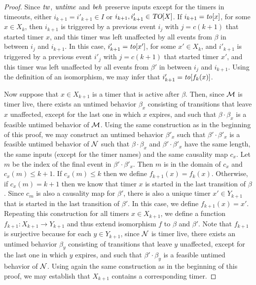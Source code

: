 \begin{proof}
Since $\mathit{tw}$, $\mathit{untime}$ and $\mathit{beh}$ preserve inputs except for the timers in timeouts,
either $i_{k+1} = i'_{k+1} \in I$ or $i_{k+1}, i'_{k+1} \in\mbox{\sl TO}[X]$.
If $i_{k+1} = \mathit{to}[x]$, for some $x \in X_k$, then $i_{k+1}$ is triggered by a previous event $i_j$ with $j=c(k+1)$ that started
timer $x$, and this timer was left unaffected by all events from $\beta$ in between $i_j$ and $i_{k+1}$. In this case,
$i'_{k+1} = \mathit{to}[x']$, for some $x' \in X_k$, and $i'_{k+1}$ is triggered by a previous event $i'_j$ with $j=c(k+1)$ that started
timer $x'$, and this timer was left unaffected by all events from $\beta'$ in between $i_j$ and $i_{k+1}$.
Using the definition of an isomorphism, we may infer that $i'_{k+1} = \mathit{to}[f_k(x)]$.

Now suppose that $x \in X_{k+1}$ is a timer that is active after $\beta$.
Then, since ${\mathcal M}$ is timer live, there exists an untimed behavior $\beta_x$ consisting of transitions that leave $x$ unaffected, except for the last one in which $x$ expires, and such that $\beta \cdot \beta_x$ is a feasible untimed behavior of ${\mathcal M}$.
Using the same construction as in the beginning of this proof, we may construct an untimed behavior $\beta'_x$ such
that $\beta' \cdot \beta'_x$ is a feasible untimed behavior of ${\mathcal N}$ such that $\beta \cdot \beta_x$ and $\beta' \cdot \beta'_x$
have the same length, the same inputs (except for the timer names) and the same causality map $c_x$.
Let $m$ be the index of the final event in $\beta' \cdot \beta'_x$. Then $m$ is in the domain of $c_x$ and $c_x(m) \leq k+1$.
If $c_x(m) \leq k$ then we define $f_{k+1}(x) = f_k (x)$.
Otherwise, if $c_x(m) = k+1$ then we know that timer $x$ is started in the last transition of $\beta$.
Since $c_m$ is also a causality map for $\beta'$, there is also a unique timer $x' \in Y_{k+1}$ that is started in the last transition of $\beta'$.
In this case, we define $f_{k+1}(x) = x'$.
Repeating this construction for all timers $x \in X_{k+1}$, we define a function $f_{k+1} : X_{k+1} \rightarrow Y_{k+1}$ and thus
extend isomorphism $f$ to $\beta$ and $\beta'$.
Note that $f_{k+1}$ is surjective because for each $y \in Y_{k+1}$, since ${\mathcal N}$ is timer live,
there exists an untimed behavior $\beta_y$ consisting of transitions that leave $y$ unaffected, except for the last one in which $y$ expires, and such that $\beta' \cdot \beta_y$ is a feasible untimed behavior of ${\mathcal N}$.
Using again the same construction as in the beginning of this proof, we may establish that $X_{k+1}$ contains a corresponding timer. 
\end{proof}

